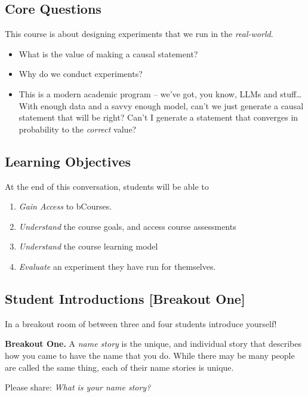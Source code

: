 \documentclass[
]{article}
\providecommand{\tightlist}{%
  \setlength{\itemsep}{0pt}\setlength{\parskip}{0pt}}
\theoremstyle{definition}
\theoremstyle{definition}
\theoremstyle{definition}
\theoremstyle{definition}
\theoremstyle{remark}
\begin{document}
\subsection{Core Questions}\label{core-questions}

This course is about designing experiments that we run in the \emph{real-world}.

\begin{itemize}
\tightlist
\item
  What is the value of making a causal statement?
\item
  Why do we conduct experiments?
\item
  This is a modern academic program -- we've got, you know, LLMs and stuff\ldots{} With enough data and a savvy enough model, can't we just generate a causal statement that will be right? Can't I generate a statement that converges in probability to the \emph{correct} value?
\end{itemize}

\subsection{Learning Objectives}\label{learning-objectives}

At the end of this conversation, students will be able to

\begin{enumerate}
\def\labelenumi{\arabic{enumi}.}
\tightlist
\item
  \emph{Gain Access} to bCourses.
\item
  \emph{Understand} the course goals, and access course assessments
\item
  \emph{Understand} the course learning model
\item
  \emph{Evaluate} an experiment they have run for themselves.
\end{enumerate}

\subsection{Student Introductions {[}Breakout One{]}}\label{student-introductions-breakout-one}

In a breakout room of between three and four students introduce yourself!

\begin{breakout}
\textbf{Breakout One.} A \emph{name story} is the unique, and individual story that describes how you came to have the name that you do. While there may be many people are called the same thing, each of their name stories is unique.

Please share: \emph{What is your name story?}

\end{breakout}
\end{document}
